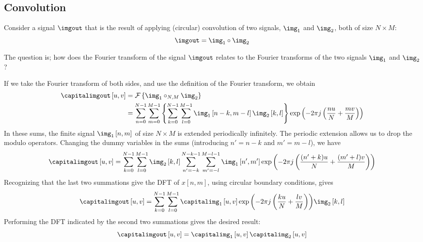 \subsection{Convolution}

Consider a signal $\imgout$ that is the result of applying (circular) convolution
of two signals, $\img_1$ and $\img_2$, both of size $N \times M$:
\begin{equation}
	\imgout = \img_1 \circ \img_2
\end{equation}

The question is; how does the Fourier transform of the signal $\imgout$ relates to the Fourier transforms of the two signals $\img_1$ and $\img_2$?



If we take the Fourier transform of both sides, and use the
definition of the Fourier transform, we obtain
\begin{equation}
	\begin{split}
		\capitalimgout \left[u,v \right] & =  \mathcal{F}  \left\{ \img_1 \circ_{N,M} \img_2 \right\} \\
		                                 & =
		\sum_{n=0}^{N-1}  \sum_{m=0}^{M-1}
		\left\{
		\sum_{k=0}^{N-1} \sum_{l=0}^{M-1}
		\img_1 \left[n-k, m-l \right] \img_2 \left[k,l \right]
		\right\}
		\exp \left(-2 \pi j \left(\frac{nu}{N} + \frac{mv}{M} \right) \right)
	\end{split}
\end{equation}
In these sums, the finite signal $\img_1 \left[n, m \right]$ of size $N \times M$ is extended periodically infinitely. The periodic extension allows us to drop the modulo operators. Changing the dummy variables in the sums (introducing $n' = n - k$
and  $m' = m - l$), we have
\begin{equation}
	\capitalimgout \left[u,v \right] =
	\sum_{k=0}^{N-1} \sum_{l=0}^{M-1}
	\img_2 \left[k,l \right]
	\sum_{n'=-k}^{N-k-1}  \sum_{m'=-l}^{M-l-1}
	\img_1 \left[n', m' \right]
	\exp{ \left(-2 \pi j \left(\frac{(n'+k)u}{N} + \frac{(m'+l)v}{M} \right) \right)}
\end{equation}
Recognizing that the last two summations give the DFT of $x\left[n,m\right]$, using
circular boundary conditions, gives
\begin{equation}
	\capitalimgout \left[u,v \right] = \sum_{k=0}^{N-1} \sum_{l=0}^{M-1}  \capitalimg_1 \left[u,v\right] \exp{ \left(-2 \pi j \left(\frac{ku}{N}+\frac{lv}{M} \right ) \right)} \img_2 \left[k,l\right]
\end{equation}
Performing the DFT indicated by the second two summations gives the
desired result:
\begin{equation}
	\capitalimgout \left[u,v\right] = \capitalimg_1 \left[u,v\right] \capitalimg_2 \left[u,v\right]
\end{equation}

